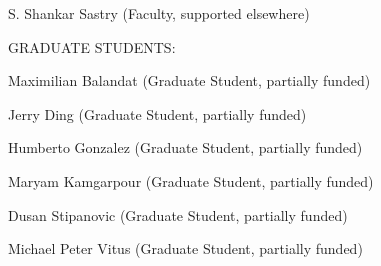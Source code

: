                \begin{indentation}{36pt}{0pt}{0pt}
                 S. Shankar Sastry (Faculty, supported elsewhere)
               \end{indentation}

               \begin{indentation}{0pt}{0pt}{0pt}
               \end{indentation}

               \begin{indentation}{0pt}{0pt}{0pt}
                 \uppercase{GRADUATE STUDENTS:}
               \end{indentation}

               \begin{indentation}{0pt}{0pt}{0pt}

               \end{indentation}

               \begin{indentation}{36pt}{0pt}{0pt}
                 Maximilian Balandat (Graduate Student, partially funded)
               \end{indentation}

               \begin{indentation}{36pt}{0pt}{0pt}
                 Jerry Ding (Graduate Student, partially funded)
               \end{indentation}

               \begin{indentation}{36pt}{0pt}{0pt}
                 Humberto Gonzalez (Graduate Student, partially funded)
               \end{indentation}

               \begin{indentation}{36pt}{0pt}{0pt}
                 Maryam Kamgarpour (Graduate Student, partially funded)
               \end{indentation}

               \begin{indentation}{36pt}{0pt}{0pt}
                 Dusan Stipanovic (Graduate Student, partially funded)
               \end{indentation}

               \begin{indentation}{36pt}{0pt}{0pt}
                 Michael Peter Vitus (Graduate Student, partially funded)
               \end{indentation}

